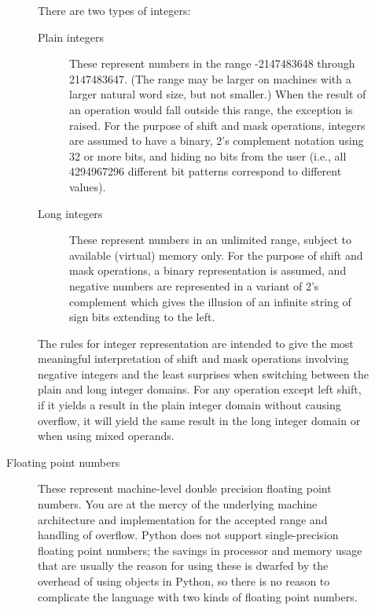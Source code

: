 \begin{description}
\begin{description}
There are two types of integers:

\begin{description}

\item[Plain integers]
These represent numbers in the range -2147483648 through 2147483647.
(The range may be larger on machines with a larger natural word
size, but not smaller.)
When the result of an operation would fall outside this range, the
exception  is raised.
For the purpose of shift and mask operations, integers are assumed to
have a binary, 2's complement notation using 32 or more bits, and
hiding no bits from the user (i.e., all 4294967296 different bit
patterns correspond to different values).

\item[Long integers]
These represent numbers in an unlimited range, subject to available
(virtual) memory only.  For the purpose of shift and mask operations,
a binary representation is assumed, and negative numbers are
represented in a variant of 2's complement which gives the illusion of
an infinite string of sign bits extending to the left.

\end{description} %

The rules for integer representation are intended to give the most
meaningful interpretation of shift and mask operations involving
negative integers and the least surprises when switching between the
plain and long integer domains.  For any operation except left shift,
if it yields a result in the plain integer domain without causing
overflow, it will yield the same result in the long integer domain or
when using mixed operands.

\item[Floating point numbers]
These represent machine-level double precision floating point numbers.  
You are at the mercy of the underlying machine architecture and
\C{} implementation for the accepted range and handling of overflow.
Python does not support single-precision floating point numbers; the
savings in processor and memory usage that are usually the reason for using
these is dwarfed by the overhead of using objects in Python, so there
is no reason to complicate the language with two kinds of floating
point numbers.


\end{description}
\end{description}
